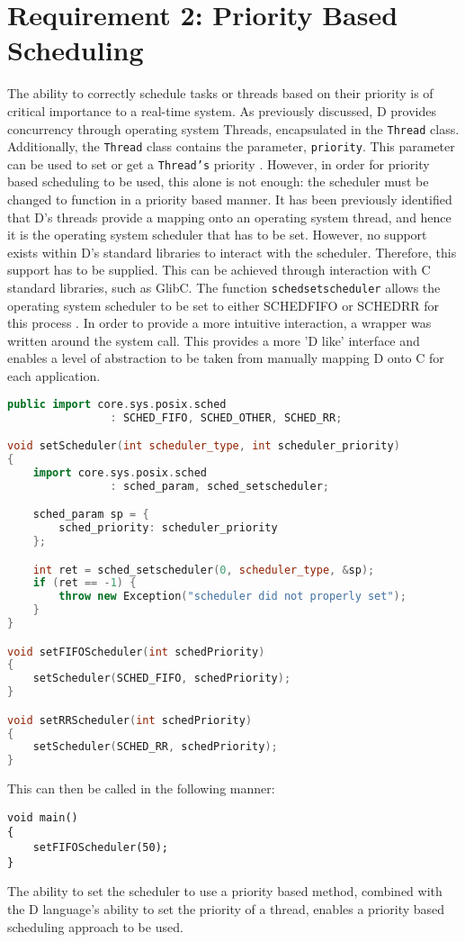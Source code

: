 \section{Requirement 2: Priority Based Scheduling}
The ability to correctly schedule tasks or threads based on their priority is of 
critical importance to a real-time system. As previously discussed, D provides 
concurrency through operating system Threads, encapsulated in the
\texttt{Thread} class. Additionally, the \texttt{Thread} class contains the 
parameter, \texttt{priority}. This parameter can be used to set or get a
\texttt{Thread's} priority \cite{core-thread}. 
However, in order for priority based scheduling to be used, this alone is not 
enough: the scheduler must be changed to function in a priority based manner. 
It has been previously identified that D's threads provide a mapping onto an operating  
system thread, and hence it is the operating system scheduler that has to be set.  
However, no support exists within D's standard libraries to interact with the
scheduler. 
Therefore, this support has to be supplied. 
This can be achieved through interaction with C standard libraries, such as GlibC. 
The function \texttt{sched\textunderscore{}setscheduler} allows the operating system 
scheduler to be set to either SCHED\textunderscore{}FIFO or SCHED\textunderscore{}RR for 
this process \cite{sched-setscheduler}. 
In order to provide a more intuitive interaction, a wrapper was written around the 
system call. This provides a more 'D like' interface and enables a level of
abstraction to be taken from manually mapping D onto C for each application. 
\begin{lstlisting}[language=C++]
public import core.sys.posix.sched 
                : SCHED_FIFO, SCHED_OTHER, SCHED_RR; 

void setScheduler(int scheduler_type, int scheduler_priority)
{
    import core.sys.posix.sched 
                : sched_param, sched_setscheduler; 

    sched_param sp = { 
        sched_priority: scheduler_priority 
    }; 

    int ret = sched_setscheduler(0, scheduler_type, &sp); 
    if (ret == -1) {
        throw new Exception("scheduler did not properly set");
    }
}

void setFIFOScheduler(int schedPriority)
{
    setScheduler(SCHED_FIFO, schedPriority);
}

void setRRScheduler(int schedPriority)
{
    setScheduler(SCHED_RR, schedPriority); 
}
\end{lstlisting}
This can then be called in the following manner: 
\begin{lstlisting}
void main()
{
    setFIFOScheduler(50); 
}
\end{lstlisting}
The ability to set the scheduler to use a priority based method, combined with 
the D language's ability to set the priority of a thread, 
enables a priority based scheduling approach to be used.  

